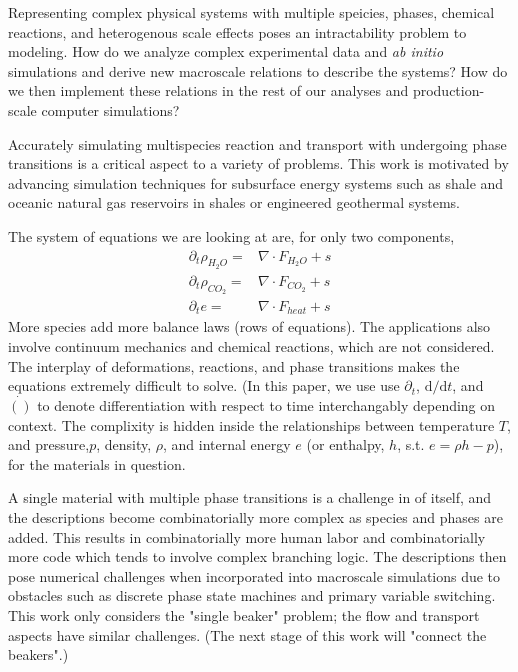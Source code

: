 \documentclass[]{article}
\begin{document}
Representing complex physical systems with multiple speicies, phases,
chemical reactions, and heterogenous scale effects poses an
intractability problem to modeling. How do we analyze complex
experimental data and \emph{ab initio} simulations and derive new
macroscale relations to describe the systems? How do we then implement
these relations in the rest of our analyses and production-scale
computer simulations?

Accurately simulating multispecies reaction and transport with
undergoing phase transitions is a critical aspect to a variety of
problems.
This work is motivated by advancing simulation techniques for subsurface energy systems such as shale
and oceanic natural gas reservoirs in shales or engineered geothermal
systems.


The system of equations we are looking at are, for only two components,
\begin{align}
  \partial_t \rho_{H_2O} =& \nabla \cdot F_{H_2O} + s \\
  \partial_t \rho_{CO_2} =& \nabla \cdot F_{CO_2} + s \\
  \partial_t e =& \nabla \cdot F_{heat} + s
\end{align}
More species add more balance laws (rows of equations). The applications also involve continuum
mechanics and chemical reactions, which are not considered. The interplay of deformations,
reactions, and phase transitions makes the equations extremely difficult
to solve. \cite{queiruga2018millstone}
(In this paper, we use use $\partial_t$, $\mathrm{d}/\mathrm{d}t$,
and $\dot{()}$ to denote differentiation with respect to time
interchangably depending on context.
The complixity is hidden inside the relationships between temperature
$T$, and pressure,$p$, density, $\rho$, and internal energy $e$ (or
enthalpy, $h$, s.t. $e=\rho h - p$), 
for the materials in question.


A single material with multiple phase transitions
is a challenge in of itself, and the descriptions become combinatorially
more complex as species and phases are added. This results in
combinatorially more human labor and combinatorially more code which
tends to involve complex branching logic. The descriptions then pose
numerical challenges when incorporated into macroscale simulations due
to obstacles such as discrete phase state machines and primary variable
switching.
This work only considers the "single beaker" problem; the flow
and transport aspects have similar challenges. (The next stage of this
work will "connect the beakers".)
\end{document}
